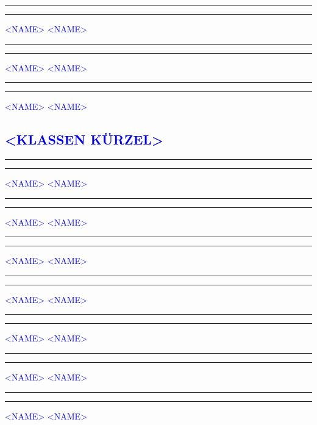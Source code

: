 \documentclass[fontsize=12pt,parskip=half]{scrartcl}
\begin{document}
\vspace{50pt}
\noindent\rule{7cm}{.4pt}\hfill\rule{7cm}{.4pt}\par
\noindent \textcolor{blue}{<NAME>} \hfill\textcolor{blue}{<NAME>}

\vspace{50pt}
\noindent\rule{7cm}{.4pt}\hfill\rule{7cm}{.4pt}\par
\noindent \textcolor{blue}{<NAME>} \hfill\textcolor{blue}{<NAME>}

\vspace{50pt}
\noindent\rule{7cm}{.4pt}\hfill\rule{7cm}{.4pt}\par
\noindent \textcolor{blue}{<NAME>} \hfill\textcolor{blue}{<NAME>}

\pagebreak
\subsection*{\textcolor{blue}{<KLASSEN KÜRZEL>}}
\vspace{50pt}
\noindent\rule{7cm}{.4pt}\hfill\rule{7cm}{.4pt}\par
\noindent \textcolor{blue}{<NAME>} \hfill\textcolor{blue}{<NAME>}

\vspace{50pt}
\noindent\rule{7cm}{.4pt}\hfill\rule{7cm}{.4pt}\par
\noindent \textcolor{blue}{<NAME>} \hfill\textcolor{blue}{<NAME>}

\vspace{50pt}
\noindent\rule{7cm}{.4pt}\hfill\rule{7cm}{.4pt}\par
\noindent \textcolor{blue}{<NAME>} \hfill\textcolor{blue}{<NAME>}

\vspace{50pt}
\noindent\rule{7cm}{.4pt}\hfill\rule{7cm}{.4pt}\par
\noindent \textcolor{blue}{<NAME>} \hfill\textcolor{blue}{<NAME>}

\vspace{50pt}
\noindent\rule{7cm}{.4pt}\hfill\rule{7cm}{.4pt}\par
\noindent \textcolor{blue}{<NAME>} \hfill\textcolor{blue}{<NAME>}

\vspace{50pt}
\noindent\rule{7cm}{.4pt}\hfill\rule{7cm}{.4pt}\par
\noindent \textcolor{blue}{<NAME>} \hfill\textcolor{blue}{<NAME>}

\vspace{50pt}
\noindent\rule{7cm}{.4pt}\hfill\rule{7cm}{.4pt}\par
\noindent \textcolor{blue}{<NAME>} \hfill\textcolor{blue}{<NAME>}
\end{document}
